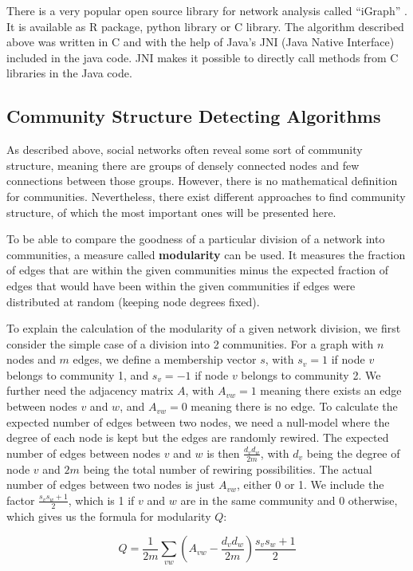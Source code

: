 There is a very popular open source library for network analysis called ``iGraph'' \cite{Igraph}. It is available as R package, python library or C library. The algorithm described above was written in C and with the help of Java's JNI (Java Native Interface) included in the java code. JNI makes it possible to directly call methods from C libraries in the Java code.

\subsection{Community Structure Detecting Algorithms}
\label{sst:communityalgorithms} As described above, social networks often reveal some sort of community structure, meaning there are groups of densely connected nodes and few connections between those groups. However, there is no mathematical definition for communities. Nevertheless, there exist different approaches to find community structure, of which the most important ones will be presented here.

To be able to compare the goodness of a particular division of a network into communities, a measure called \textbf{modularity} can be used. It measures the fraction of edges that are within the given communities minus the expected fraction of edges that would have been within the given communities if edges were distributed at random (keeping node degrees fixed). 

To explain the calculation of the modularity of a given network division, we first consider the simple case of a division into 2 communities. For a graph with $n$ nodes and $m$ edges, we define a membership vector $s$, with $s_v = 1$ if node $v$ belongs to community 1, and $s_v = -1$ if node $v$ belongs to community 2. We further need the adjacency matrix $A$, with $A_{vw} = 1$ meaning there exists an edge between nodes $v$ and $w$, and $A_{vw} = 0$ meaning there is no edge. To calculate the expected number of edges between two nodes, we need a null-model where the degree of each node is kept but the edges are randomly rewired. The expected number of edges between nodes $v$ and $w$ is then $\frac{d_v d_w}{2m}$, with $d_v$ being the degree of node $v$ and $2m$ being the total number of rewiring possibilities. The actual number of edges between two nodes is just $A_{vw}$, either 0 or 1. We include the factor $\frac{s_v s_w  + 1}{2}$, which is 1 if $v$ and $w$ are in the same community and 0 otherwise, which gives us the formula for modularity $Q$:

\begin{equation}
Q = \frac{1}{2m} \sum_{vw}(A_{vw} - \frac{d_v d_w}{2m}) \frac{s_v s_w  + 1}{2}
\label{eq:modularity}
\end{equation}

